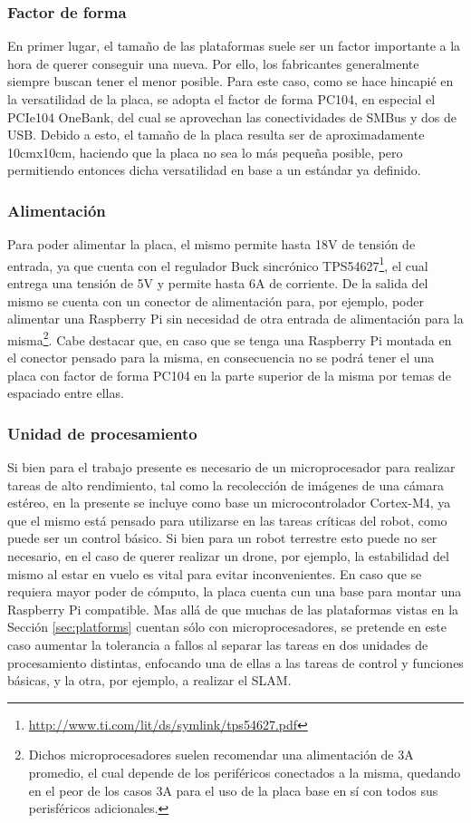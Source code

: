 \subsubsection{Factor de forma}
En primer lugar, el tamaño de las plataformas suele ser un factor importante a la hora de querer conseguir una nueva. Por ello, los fabricantes generalmente siempre buscan tener el menor posible. Para este caso, como se hace hincapié en la versatilidad de la placa, se adopta el factor de forma PC104, en especial el PCIe104 OneBank, del cual se aprovechan las conectividades de SMBus y dos de USB. Debido a esto, el tamaño de la placa resulta ser de aproximadamente 10cmx10cm, haciendo que la placa no sea lo más pequeña posible, pero permitiendo entonces dicha versatilidad en base a un estándar ya definido.

\subsubsection{Alimentación}
Para poder alimentar la placa, el mismo permite hasta 18V de tensión de entrada, ya que cuenta con el regulador Buck sincrónico TPS54627\footnote{\url{http://www.ti.com/lit/ds/symlink/tps54627.pdf}}, el cual entrega una tensión de 5V y permite hasta 6A de corriente. De la salida del mismo se cuenta con un conector de alimentación para, por ejemplo, poder alimentar una Raspberry Pi sin necesidad de otra entrada de alimentación para la misma\footnote{Dichos microprocesadores suelen recomendar una alimentación de 3A promedio, el cual depende de los periféricos conectados a la misma, quedando en el peor de los casos 3A para el uso de la placa base en sí con todos sus perisféricos adicionales.}. Cabe destacar que, en caso que se tenga una Raspberry Pi montada en el conector pensado para la misma, en consecuencia no se podrá tener el una placa con factor de forma PC104 en la parte superior de la misma por temas de espaciado entre ellas.

\subsubsection{Unidad de procesamiento}
Si bien para el trabajo presente es necesario de un microprocesador para realizar tareas de alto rendimiento, tal como la recolección de imágenes de una cámara estéreo, en la presente se incluye como base un microcontrolador Cortex-M4, ya que el mismo está pensado para utilizarse en las tareas críticas del robot, como puede ser un control básico. Si bien para un robot terrestre esto puede no ser necesario, en el caso de querer realizar un drone, por ejemplo, la estabilidad del mismo al estar en vuelo es vital para evitar inconvenientes. En caso que se requiera mayor poder de cómputo, la placa cuenta cun una base para montar una Raspberry Pi compatible. Mas allá de que muchas de las plataformas vistas en la Sección \ref{sec:platforms} cuentan sólo con microprocesadores, se pretende en este caso aumentar la tolerancia a fallos al separar las tareas en dos unidades de procesamiento distintas, enfocando una de ellas a las tareas de control y funciones básicas, y la otra, por ejemplo, a realizar el SLAM.


